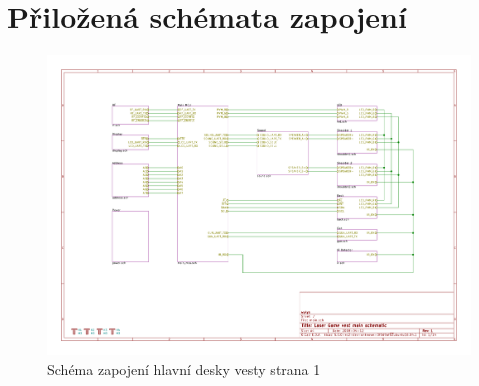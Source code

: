 \chapter{Přiložená schémata zapojení}

\begin{landscape}
    \begin{figure}[h]
        \centering
        \includegraphics[page=1, height=\textwidth]{sch/main}
        \caption{Schéma zapojení hlavní desky vesty strana 1}
    \end{figure}
\end{landscape}
